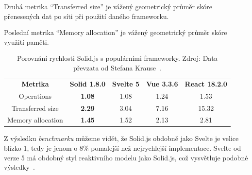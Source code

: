 Druhá metrika ``Transferred size'' je vážený geometrický průměr skóre přenesených dat po síti při použití daného frameworku.

Poslední metrika ``Memory allocation'' je vážený geometrický průměr skóre využití paměti.

\begin{table}[ht]
  \begin{ctucolortab}
    \begin{tabular}{c c c c c}
      \bfseries Metrika & \bfseries{Solid 1.8.0} & \bfseries{Svelte 5} & \bfseries{Vue 3.3.6} & \bfseries{React 18.2.0} \\\Midrule{}
      Operations        & \textbf{1.08}          & 1.08                & 1.24                 & 1.53                    \\
      Transferred size  & \textbf{2.29}          & 3.04                & 7.16                 & 15.32                   \\
      Memory allocation & \textbf{1.45}          & 1.52                & 2.13                 & 2.81
    \end{tabular}
  \end{ctucolortab}
  \captionsetup{justification=centering}
  \caption[Porovnání rychlosti Solid.js s populárními frameworky.]{Porovnání rychlosti Solid.js s populárními frameworky. \newline Zdroj: Data převzata od Stefana Krause~\cite{krausest120,krausest122}.}
  \label{tab:technology1}
\end{table}

Z výsledku \textit{benchmarku} můžeme vidět, že Solid.js obdobně jako Svelte je velice blízko 1, tedy je jenom o 8\% pomalejší než nejrychlejší implementace.
Svelte od verze 5 má obdobný styl reaktivního modelu jako Solid.js, což vysvětluje podobné výsledky~\cite{svelte-reactivity}.




